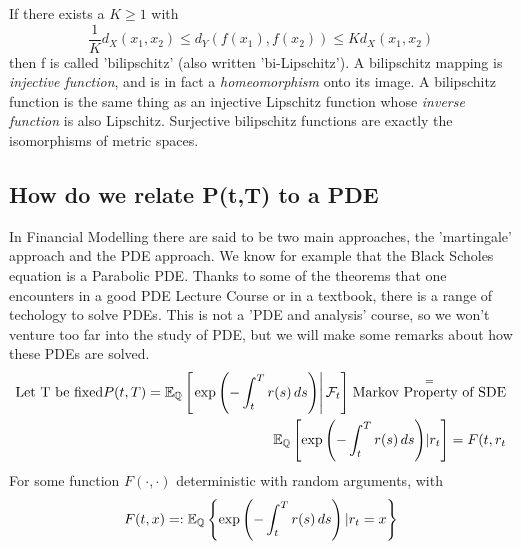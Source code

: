 \begin{dfn}
If there exists a $K \geq 1$ with
\begin{displaymath}\frac{1}{K}d_X(x_1,x_2) \le d_Y(f(x_1), f(x_2)) \le K d_X(x_1, x_2)\end{displaymath}
then ƒ is called 'bilipschitz' (also written 'bi-Lipschitz').  A bilipschitz mapping is 
\textit{injective function}, and is in fact a 			
\textit{homeomorphism} onto its image.  A bilipschitz function is the same thing as an 
injective Lipschitz function whose 			
\textit{inverse function} is also Lipschitz. 
 Surjective bilipschitz functions are exactly the isomorphisms of metric spaces.
\end{dfn}
\subsection{How do we relate P(t,T) to a PDE}
In Financial Modelling there are said to be two main approaches, the 'martingale' approach and the PDE approach.
We know for example that the Black Scholes equation is a Parabolic PDE. Thanks to some of the theorems that one 
encounters in a good PDE Lecture Course or in a textbook, there is a range of techology to solve PDEs. 
 This is not a 'PDE and analysis' course, so we won't venture too far into the study of PDE, but we will
make some remarks about how these PDEs are solved. 
\begin{align}
 \text{Let T be fixed} P(t,T) = \mathbb{E}_{\mathbb{Q}}\left[\left. \exp{\left(-\int_t^T r(s)\, ds\right) } \right| 
\mathcal{F}_t \right] \stackrel{=}{\text{Markov Property of SDE}} \\
\mathbb{E}_{\mathbb{Q}} \left[ \exp{\left(-\int_t^T r(s)\, ds\right) } | r_{t}\right] = F(t,r_{t}
\end{align}
For some function $F(\cdot, \cdot)$ deterministic with random arguments, with 
\begin{displaymath}
F(t,x) =: \mathbb{E}_{\mathbb{Q}} \left\lbrace \exp\left(-\int_t^T r(s)\, ds\right)  |r_{t} =x\right\rbrace 
\end{displaymath}

